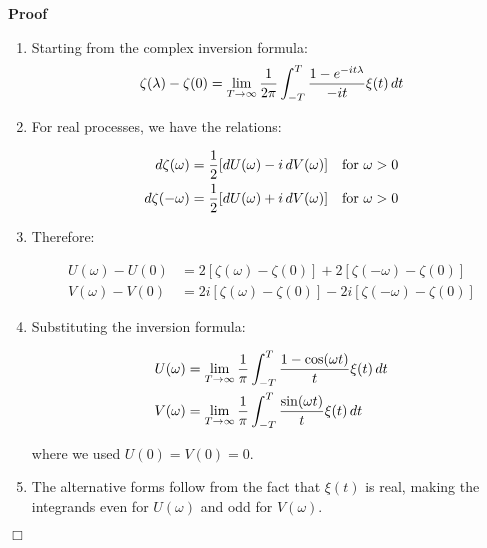 \documentclass{article}
\newenvironment{proof}{\noindent\textbf{Proof\ }}{\hspace*{\fill}$\Box$\medskip}
\begin{document}
\begin{proof}
  \begin{enumerate}
    \item Starting from the complex inversion formula:
    \begin{equation}
      \zeta (\lambda) - \zeta (0) = \lim_{T \to \infty}  \frac{1}{2 \pi} 
      \int_{- T}^T \frac{1 - e^{- it \lambda}}{- it} \xi (t)  \hspace{0.17em}
      dt
    \end{equation}
    \item For real processes, we have the relations:
    
    \begin{align}
      d \zeta (\omega) & = \frac{1}{2}  [dU (\omega) - i \hspace{0.17em} dV
      (\omega)]  \quad \text{for } \omega > 0 \\
      d \zeta (- \omega) & = \frac{1}{2}  [dU (\omega) + i \hspace{0.17em} dV
      (\omega)]  \quad \text{for } \omega > 0 
    \end{align}
    
    \item Therefore:
    
    \begin{align}
      U (\omega) - U (0) & = 2 [\zeta (\omega) - \zeta (0)] + 2 [\zeta (-
      \omega) - \zeta (0)] \\
      V (\omega) - V (0) & = 2 i [\zeta (\omega) - \zeta (0)] - 2 i [\zeta (-
      \omega) - \zeta (0)] 
    \end{align}
    
    \item Substituting the inversion formula:
    
    \begin{align}
      U (\omega) & = \lim_{T \to \infty}  \frac{1}{\pi}  \int_{- T}^T \frac{1
      - \cos (\omega t)}{t} \xi (t)  \hspace{0.17em} dt \\
      V (\omega) & = \lim_{T \to \infty}  \frac{1}{\pi}  \int_{- T}^T
      \frac{\sin (\omega t)}{t} \xi (t)  \hspace{0.17em} dt 
    \end{align}
    
    where we used $U (0) = V (0) = 0$.
    
    \item The alternative forms follow from the fact that $\xi (t)$ is real,
    making the integrands even for $U (\omega)$ and odd for $V (\omega)$.
  \end{enumerate}
\end{proof}
\end{document}
